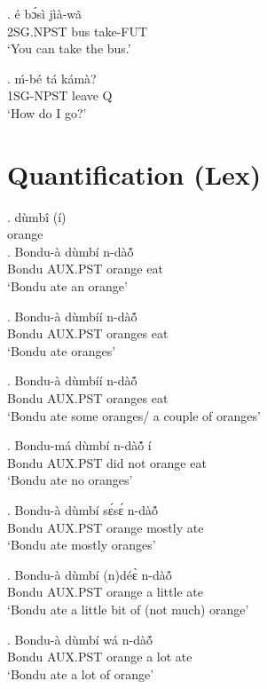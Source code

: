 \documentclass{assets/fieldnotes}
\begin{document}
{\exg. é bɔ́sì jìà-wã\\
    2SG.NPST bus take-FUT\\
    `You can take the bus.'

\exg. ḿ-bé tá kámà?\\
    1SG-NPST leave Q\\
    `How do I go?'

\section{Quantification (Lex)} 


\exg. dùmbî (í)\\ 
orange\\

\exg. Bondu-à dùmbí n-dàó̃ \\
Bondu AUX.PST orange eat\\
`Bondu ate an orange'

\exg. Bondu-à dùmbíí n-dàó̃ \\
Bondu AUX.PST oranges eat\\
`Bondu ate oranges'


\exg. Bondu-à dùmbíí n-dàó̃ \\
Bondu AUX.PST oranges eat\\
`Bondu ate some oranges/ a couple of oranges'

\exg. Bondu-má dùmbí n-dàó̃ í\\
Bondu AUX.PST did not orange eat\\
`Bondu ate no oranges' 


\exg. Bondu-à dùmbí sɛ́sɛ́ n-dàó̃ \\
Bondu AUX.PST orange mostly ate\\
`Bondu ate mostly oranges'

\exg. Bondu-à dùmbí (n)déɛ̀ n-dàó̃ \\
Bondu AUX.PST orange a little ate\\
`Bondu ate a little bit of (not much) orange'

\exg. Bondu-à dùmbí wá n-dàó̃ \\
Bondu AUX.PST orange a lot ate\\
`Bondu ate a lot of orange'

}
\end{document}
